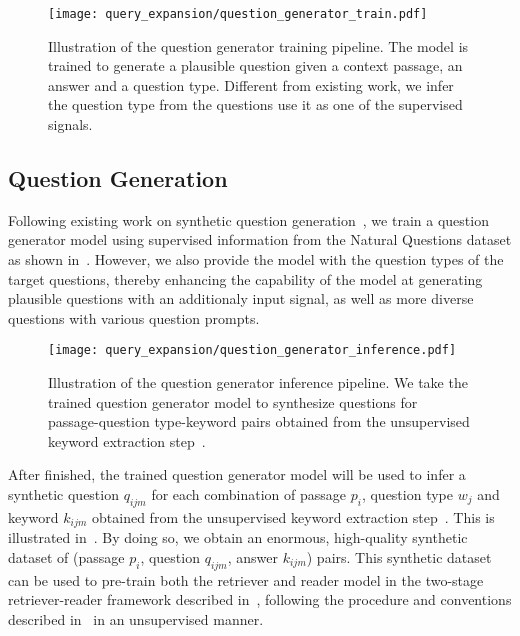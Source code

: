 \begin{figure}[!htbp]
	\centering
	\texttt{[image: query\_expansion/question\_generator\_train.pdf]}
	\caption[Illustration of the question generator training pipeline.]{
		Illustration of the question generator training pipeline.
		The model is trained to generate a plausible question given a context passage, an answer and a question type.
		Different from existing work, we infer the question type from the questions use it as one of the supervised signals.
	}
	\label{fig:question_generator_train}
\end{figure}


\subsection{Question Generation}
\label{sec:question_generation_method}
%
Following existing work on synthetic question generation~\cite{alberti2019synthetic, chan2019recurrent, sultan2020importance, lewis2021paq}, we train a question generator model using supervised information from the Natural Questions dataset as shown in~.
%
However, we also provide the model with the question types of the target questions, thereby enhancing the capability of the model at generating plausible questions with an additionaly input signal, as well as more diverse questions with various question prompts.
%

\begin{figure}[!htbp]
	\centering
	\texttt{[image: query\_expansion/question\_generator\_inference.pdf]}
	\caption[Illustration of the question generator inference pipeline.]{
		Illustration of the question generator inference pipeline.
		We take the trained question generator model to synthesize questions for passage-question type-keyword pairs obtained from the unsupervised keyword extraction step~.
	}
	\label{fig:question_generator_inference}
\end{figure}

%
After finished, the trained question generator model will be used to infer a synthetic question $q_{ijm}$ for each combination of passage $p_i$, question type $w_j$ and keyword $k_{ijm}$ obtained from the unsupervised keyword extraction step~.
%
This is illustrated in~.
%
By doing so, we obtain an enormous, high-quality synthetic dataset of (passage $p_i$, question $q_{ijm}$, answer $k_{ijm}$) pairs.
%
This synthetic dataset can be used to pre-train both the retriever and reader model in the two-stage retriever-reader framework described in~, following the procedure and conventions described in~ in an unsupervised manner.

